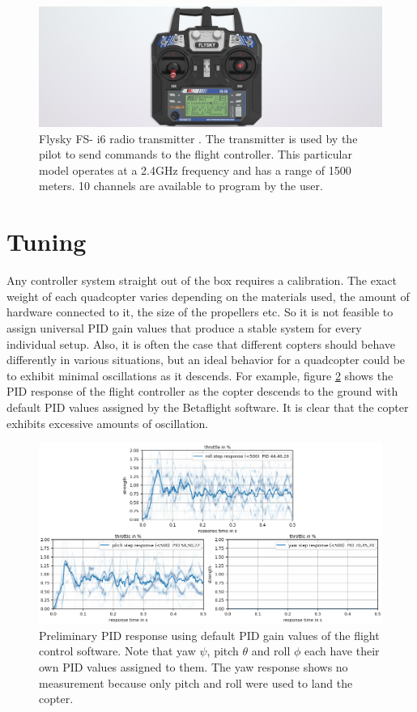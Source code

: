 \documentclass[11pt]{ucthesis}
\begin{document}
\begin{figure}[H]
	\centering
	\includegraphics[width=\textwidth,height=\textheight,keepaspectratio]{flysky2}
	\caption[Transmitter]{Flysky FS- i6 radio transmitter \cite{transmitter}. The transmitter is used by the pilot to send commands to the flight controller. This particular model operates at a 2.4GHz frequency and has a range of 1500 meters. 10 channels are available to program by the user.}
	\label{fig:transmitter}
\end{figure}
\section{Tuning}
Any controller system straight out of the box requires a calibration. The exact weight of each quadcopter varies depending on the materials used, the amount of hardware connected to it, the size of the propellers etc. So it is not feasible to assign universal PID gain values that produce a stable system for every individual setup. Also, it is often the case that different copters should behave differently in various situations, but an ideal behavior for a quadcopter could be to exhibit minimal oscillations as it descends. For example, figure \ref{fig:initread} shows the PID response of the flight controller as the copter descends to the ground with default PID values assigned by the Betaflight software. It is clear that the copter exhibits excessive amounts of oscillation.
\begin{figure}[H]
	\includegraphics[width=1\textwidth]{initialreading}
	\caption[Preliminary PID Reading]{Preliminary PID response using default PID gain values of the flight control software. Note that yaw $\psi$, pitch $\theta$ and roll $\phi$ each have their own PID values assigned to them. The yaw response shows no measurement because only pitch and roll were used to land the copter.}
	\label{fig:initread}
\end{figure}
\end{document}
